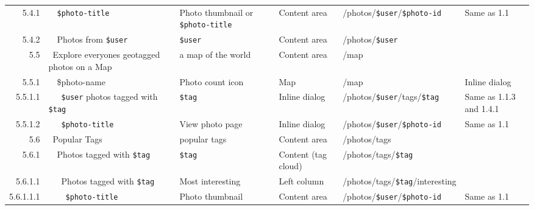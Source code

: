 \documentclass[12pt,a4paper]{article}
\newcommand{\var}[1]{\texttt{\${#1}}}
\begin{document}
\begin{landscape}
\begin{table}[h!b!p!]
\begin{center}
\begin{tiny}
\begin{tabular}{r|l|l|l|l|p{3cm}}
                5.4.1 &
                ~~\var{photo-title} &
                Photo thumbnail or \var{photo-title} &
                Content area &
                /photos/\var{user}/\var{photo-id} &
                Same as 1.1 \\

                5.4.2 &
                ~~Photos from \var{user} &
                \var{user} &
                Content area &
                /photos/\var{user} &
                \\

              5.5 &
              ~Explore everyones geotagged photos on a Map &
              a map of the world &
              Content area &
              /map &
              \\

                5.5.1 &
                ~~\$photo-name &
                Photo count icon &
                Map &
                /map &
                Inline dialog\\

                  5.5.1.1 &
                  ~~~\var{user} photos tagged with \var{tag} &
                  \var{tag} &
                  Inline dialog &
                  /photos/\var{user}/tags/\var{tag} &
                  Same as 1.1.3 and 1.4.1\\

                  5.5.1.2 &
                  ~~~\var{photo-title} &
                  View photo page &
                  Inline dialog &
                  /photos/\var{user}/\var{photo-id} &
                  Same as 1.1 \\

              5.6 &
              ~Popular Tags &
              popular tags &
              Content area &
              /photos/tags &
              \\

                5.6.1 &
                ~~Photos tagged with \var{tag} &
                \var{tag} &
                Content (tag cloud) &
                /photos/tags/\var{tag} &
                \\

                  5.6.1.1 &
                  ~~~Photos tagged with \var{tag} &
                  Most interesting &
                  Left column &
                  /photos/tags/\var{tag}/interesting &
                  \\

                    5.6.1.1.1 &
                    ~~~~\var{photo-title} &
                    Photo thumbnail &
                    Content area &
                    /photos/\var{user}/\var{photo-id} &
                    Same as 1.1 \\


\end{tabular}
\end{tiny}
\end{center}
\end{table}
\end{landscape}
\end{document}
